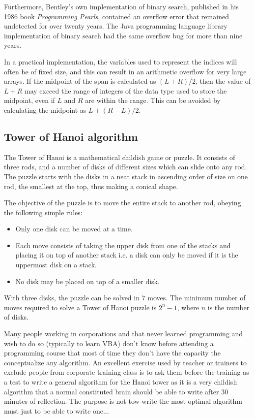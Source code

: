 	Furthermore, Bentley's own implementation of binary search, published in his 1986 book \textit{Programming Pearls}, contained an overflow error that remained undetected for over twenty years. The Java programming language library implementation of binary search had the same overflow bug for more than nine years.

	In a practical implementation, the variables used to represent the indices will often be of fixed size, and this can result in an arithmetic overflow for very large arrays. If the midpoint of the span is calculated as $(L+R)/2$, then the value of $L+R$ may exceed the range of integers of the data type used to store the midpoint, even if $L$ and $R$ are within the range. This can be avoided by calculating the midpoint as $L+(R-L)/2$.

	\pagebreak
	\subsection{Tower of Hanoi algorithm}
	The Tower of Hanoi is a mathematical childish game or puzzle. It consists of three rods, and a number of disks of different sizes which can slide onto any rod. The puzzle starts with the disks in a neat stack in ascending order of size on one rod, the smallest at the top, thus making a conical shape.

	The objective of the puzzle is to move the entire stack to another rod, obeying the following simple rules:
	\begin{itemize}
		\item Only one disk can be moved at a time.
		\item Each move consists of taking the upper disk from one of the stacks and placing it on top of another stack i.e. a disk can only be moved if it is the uppermost disk on a stack.
		\item No disk may be placed on top of a smaller disk.
	\end{itemize}
	With three disks, the puzzle can be solved in $7$ moves. The minimum number of moves required to solve a Tower of Hanoi puzzle is $2^n - 1$, where $n$ is the number of disks.

	Many people working in corporations and that never learned programming and wish to do so (typically to learn VBA) don't know before attending a programming course that most of time they don't have the capacity the conceptualize any algorithm. An excellent exercise used by teacher or trainers to exclude people from corporate training class is to ask them before the training as a test to write a general algorithm for the Hanoi tower as it is a very childish algorithm that a normal constituted brain should be able to write after $30$ minutes of reflection. The purpose is not tow write the most optimal algorithm must just to be able to write one...
	

